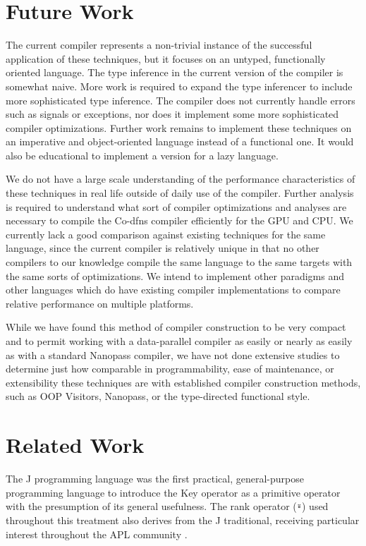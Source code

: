 \documentclass[numbers,preprint]{sigplanconf}
\begin{document}
\section{Future Work}

The current compiler represents a non-trivial instance of
the successful application of these techniques, but it focuses on an untyped, 
functionally oriented language. The type inference in the current version 
of the compiler is somewhat naive. More work is required to expand the 
type inferencer to include more sophisticated type inference. 
The compiler does not currently handle errors such as signals or 
exceptions, nor does it implement some more sophisticated compiler optimizations.
Further work remains to implement these techniques on an imperative and 
object-oriented language instead of a functional one. It would also be 
educational to implement a version for a lazy language. 

We do not have a large scale understanding of the performance characteristics 
of these techniques in real life outside of daily use of the compiler.
Further analysis is
required to understand what sort of compiler optimizations and analyses are 
necessary to compile the Co-dfns compiler efficiently for the GPU and CPU. 
We currently lack a good comparison against existing techniques for the same 
language, since the current compiler is relatively unique in that no other 
compilers to our knowledge compile the same language to the same targets 
with the same sorts of optimizations. We intend to implement other paradigms 
and other languages which do have existing compiler implementations to compare 
relative performance on multiple platforms. 

While we have found this method of compiler construction to be very compact 
and to permit working with a data-parallel compiler as easily or nearly as 
easily as with a standard Nanopass compiler, we have not done extensive 
studies to determine just how comparable in programmability, ease of 
maintenance, or extensibility these techniques are with established 
compiler construction methods, such as OOP Visitors, Nanopass, or the 
type-directed functional style.

\section{Related Work}

The J programming language \cite{hui2014key} was the first practical,
general-purpose programming language to introduce the Key operator as a
primitive operator with the presumption of its general usefulness. The
rank operator (\verb;⍤;) used throughout this treatment also derives from
the J traditional, receiving particular interest throughout the APL
community \cite{bernecky1987rank,hui1995rank}.
\end{document}
